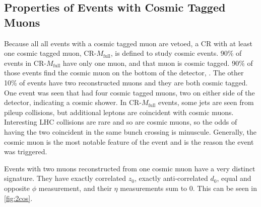 




\subsection{Properties of Events with Cosmic Tagged Muons}
Because all all events with a cosmic tagged muon are vetoed, a \ac{CR} with at least one cosmic tagged muon, CR-$M_{\textrm{full}}$, is defined to study cosmic events. 90\% of events in CR-$M_{\textrm{full}}$ have only one muon, and that muon is cosmic tagged. 90\% of those events find the cosmic muon on the bottom of the detector, \mb. The other 10\% of events have two reconstructed muons and they are both cosmic tagged. One event was seen that had four cosmic tagged muons, two on either side of the detector, indicating a cosmic shower. In CR-$M_{\textrm{full}}$ events, some jets are seen from pileup collisions, but additional leptons are coincident with cosmic muons. Interesting \ac{LHC} collisions are rare and so are cosmic muons, so the odds of having the two coincident in the same bunch crossing is minuscule. Generally, the cosmic muon is the most notable feature of the event and is the reason the event was triggered.

Events with two muons reconstructed from one cosmic muon have a very distinct signature. They have exactly correlated $z_{0}$, exactly anti-correlated $d_{0}$, equal and opposite $\phi$ measurement, and their $\eta$ measurements sum to 0. This can be seen in \autoref{fig:2cos}.

